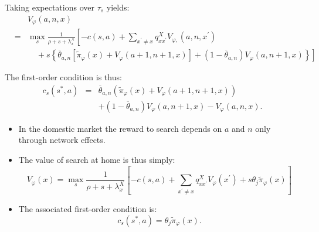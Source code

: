 \documentclass[notes=show]{beamer}
\begin{document}
\begin{frame}%



Taking expectations over $\tau _{s}$ yields:%
\begin{eqnarray*}
&&V_{\varphi }(a,n,x) \\
&=&\max_{s}\frac{1}{\rho +s+\lambda _{x}^{X}}\left[ -c(s,a)+\sum_{x^{\prime
}\neq x}q_{xx^{\prime }}^{X}V_{\varphi ,}(a,n,x^{\prime })\right. \\
&&\left. 
\begin{array}{c}
\; \\ 
\;%
\end{array}%
+s\left\{ \overline{\theta }_{a,n}\left[ \widetilde{\pi }_{\varphi
}(x)+V_{\varphi }(a+1,n+1,x)\right] +(1-\overline{\theta }_{a,n})V_{\varphi
}(a,n+1,x)\right\} \right]
\end{eqnarray*}

The first-order condition is thus:%
\begin{eqnarray*}
c_{s}(s^{\ast },a) &=&\overline{\theta }_{a,n}(\widetilde{\pi }_{\varphi
}(x)+V_{\varphi }(a+1,n+1,x)) \\
&&+(1-\overline{\theta }_{a,n})V_{\varphi }(a,n+1,x)-V_{\varphi }(a,n,x).
\end{eqnarray*}

\end{frame}%
\begin{frame}%



\begin{itemize}
\item In the domestic market the reward to search depends on $a$ and $n$
only through network effects.

\item The value of search at home is thus simply:%
\[
V_{\varphi }(x)=\max_{s}\frac{1}{\rho +s+\lambda _{x}^{X}}\left[
-c(s,a)+\sum_{x^{\prime }\neq x}q_{xx^{\prime }}^{X}V_{\varphi }(x^{\prime
})+s\theta _{j}\widetilde{\pi }_{\varphi }(x)\right] 
\]

\item The associated first-order condition is:%
\[
c_{s}(s^{\ast },a)=\theta _{j}\widetilde{\pi }_{\varphi }(x). 
\]
\end{itemize}

\end{frame}%
\end{document}
